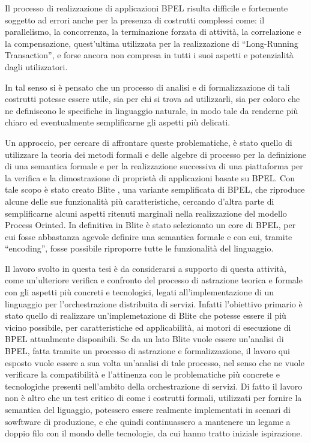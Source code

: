 Il processo di realizzazione di applicazioni BPEL
risulta difficile e fortemente soggetto ad errori anche per la presenza di
costrutti complessi come: il parallelismo, la concorrenza, la terminazione
forzata di attività, la correlazione e la compensazione, quest'ultima utilizzata
per la realizzazione di ``Long-Running Transaction'', e forse ancora non 
compresa in tutti i suoi aspetti e potenzialità dagli utilizzatori. 

In tal senso si è pensato che un processo di analisi e di formalizzazione di tali
costrutti potesse essere utile, sia per chi si trova ad utilizzarli, sia per
coloro che ne definiscono le specifiche in linguaggio naturale, in modo tale da renderne
più chiaro ed eventualmente semplificarne gli aspetti più delicati.

Un approccio, per cercare di affrontare queste problematiche, è stato quello di
utilizzare la teoria dei metodi formali e delle algebre di processo per la
definizione di una semantica formale e per la realizzazione successiva di una
piattaforma per la verifica e la dimostrazione di proprietà di applicazioni
basate su BPEL. Con tale scopo è stato creato Blite \cite{LaPuTie1}, una variante
semplificata di BPEL, che riproduce alcune delle sue funzionalità più
caratteristiche, cercando d'altra parte di semplificarne alcuni aspetti ritenuti
marginali nella realizzazione del modello Process Orinted. In definitiva in
Blite è stato selezionato un core di BPEL, per cui fosse abbastanza agevole
definire una semantica formale e con cui, tramite ``encoding'', fosse possibile riproporre
tutte le funzionalità del linguaggio.

Il lavoro svolto in questa tesi è da considerarsi a supporto di questa attività,
come un'ulteriore verifica e confronto del processo di astrazione teorica e
formale con gli aspetti più concreti e tecnologici, legati all'implementazione di
un linguaggio per l'orchestrazione distribuita di servizi. Infatti l'obiettivo
primario è stato quello di realizzare un'implemetazione di Blite che potesse
essere il più vicino possibile, per caratteristiche ed applicabilità, ai motori
di esecuzione di BPEL attualmente disponibili. Se da un lato Blite vuole essere
un'analisi di BPEL, fatta tramite un processo di astrazione e formalizzazione,
il lavoro qui esposto vuole essere a sua volta un'analisi di tale processo, nel
senso che ne vuole verificare la compatibilità e l'attinenza con le problematiche
più concrete e tecnologiche presenti nell'ambito della orchestrazione di servizi.
Di fatto il lavoro non è altro che un test critico di come i costrutti formali,
utilizzati per fornire la semantica del liguaggio, potessero essere realmente
implementati in scenari di sowftware di produzione, e che quindi continuassero a
mantenere un legame a doppio filo con il mondo delle tecnologie, da cui hanno
tratto iniziale ispirazione. 


